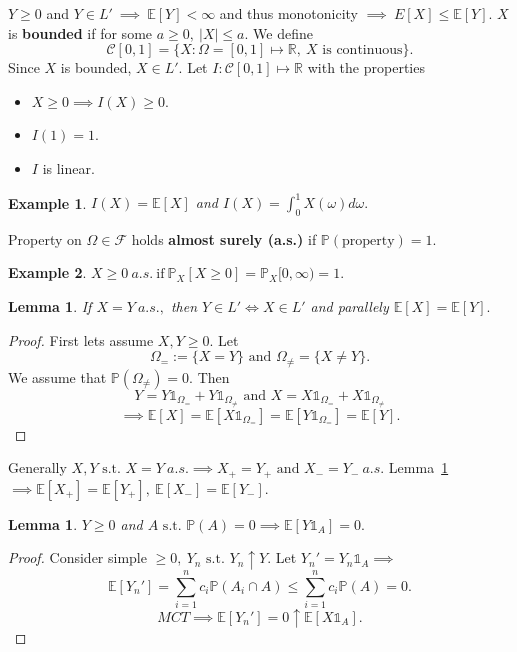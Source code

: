 \documentclass{article}
\newcommand{\1}{\mathds{1}}
\newcommand{\R}{\mathbb{R}}
\newcommand{\E}{\mathbb{E}}
\newcommand{\F}{\mathcal{F}}
\newcommand{\PB}{\mathbb{P}}
\newcommand{\lf}{\left}
\newcommand{\rg}{\right}
\newcommand{\C}{\mathcal{C}}
\newcommand{\st}{\text{ s.t. }}
\newcommand{\card}[1]{\lf\vert #1\rg\vert}
\newtheorem{lemma}[theorem]{Lemma}
\newtheorem{example}{Example}
\begin{document}
    $Y\geq 0$ and $Y\in L'\ \implies\ \E[Y]<\infty$ and thus monotonicity $\implies\ E[X]\leq \E[Y].$ $X$ is \textbf{bounded} if for some $a\geq 0,\ \card{X}\leq a.$ We define $$\C[0,1]=\{X:\Omega=[0,1]\mapsto\R,\ X\text{ is continuous}\}.$$ Since $X$ is bounded, $X\in L'.$ Let $I:\C[0,1]\mapsto\R$ with the properties
    \begin{itemize}
        \item $X\geq 0\implies I(X)\geq 0.$
        \item $I(1)=1.$
        \item $I$ is linear.
    \end{itemize}
    \begin{example}
        $I(X)=\E[X]$ and $I(X)=\int_{0}^1X(\omega)d\omega.$ 
        \end{example}
        Property on $\Omega\in\F$ holds \textbf{almost surely (a.s.)} if $\PB(\text{property})=1.$ 
    \begin{example}
        $X\geq 0\ a.s.\ \text{if}\ \PB_X[X\geq 0]=\PB_X[0,\infty)=1.$ 
    \end{example}
    \begin{lemma}\label{leexy}
         If $X=Y\ a.s.,$ then $Y\in L'\iff X\in L'$ and parallely $\E[X]=\E[Y].$
    \end{lemma}
   \begin{proof}
       First lets assume $X,Y\geq 0.$ Let $$\Omega_=:=\{X=Y\}\text{ and }\Omega_\ne=\{X\ne Y\}.$$ We assume that $\PB(\Omega_\ne)=0.$
       Then $$Y=Y\1_{\Omega_=}+Y\1_{\Omega_\ne}\text{ and }X=X\1_{\Omega_=}+X\1_{\Omega_\ne}$$ $$\implies \E[X]=\E[X\1_{\Omega_=}]=\E[Y\1_{\Omega_=}]=\E[Y].$$
   \end{proof} 
Generally $X,Y\st X=Y\ a.s.\implies X_+=Y_+\text{ and }X_-=Y_-\ a.s.$ Lemma~\ref{leexy} $\implies \E[X_+]=\E[Y_+],\ \E[X_-]=\E[Y_-].$ 
\begin{lemma}
    $Y\geq 0$ and $A\st\PB(A)=0\implies \E[Y\1_A]=0.$
\end{lemma}
\begin{proof}
    Consider simple $\geq0,\ Y_n\st Y_n\uparrow Y.$ Let $Y_n'=Y_n\1_A\implies$ $$\E[Y_n']=\sum_{i=1}^nc_i\PB(A_i\cap A)\leq \sum_{i=1}^nc_i\PB(A)=0.$$ $$MCT\implies \E[Y_n']=0\uparrow\E[X\1_A].$$ 
\end{proof}
\end{document}
